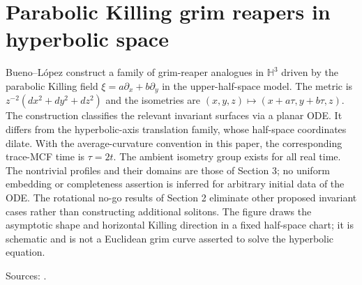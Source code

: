 \chapter{Parabolic Killing grim reapers in hyperbolic space}\label{sec:catalogue-hyperbolic-parabolic-grims}
\begin{example}\label{ex:catalogue-hyperbolic-parabolic-grims}
Bueno--L\'opez construct a family of grim-reaper analogues in $\mathbb H^3$ driven by the parabolic Killing field $\xi=a\partial_x+b\partial_y$ in the upper-half-space model. The metric is $z^{-2}(dx^2+dy^2+dz^2)$ and the isometries are $(x,y,z)\mapsto(x+a\tau,y+b\tau,z)$. The construction classifies the relevant invariant surfaces via a planar ODE. It differs from the hyperbolic-axis translation family, whose half-space coordinates dilate.
With the average-curvature convention in this paper, the corresponding trace-MCF time is $\tau=2t$. The ambient isometry group exists for all real time. The nontrivial profiles and their domains are those of Section 3; no uniform embedding or completeness assertion is inferred for arbitrary initial data of the ODE. The rotational no-go results of Section 2 eliminate other proposed invariant cases rather than constructing additional solitons. The figure draws the asymptotic shape and horizontal Killing direction in a fixed half-space chart; it is schematic and is not a Euclidean grim curve asserted to solve the hyperbolic equation.
\par Sources: \cite{CatBuenoLopez2024a}.
\end{example}

